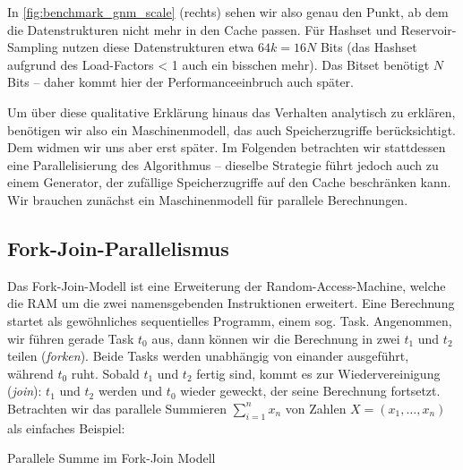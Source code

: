 In \cref{fig:benchmark_gnm_scale} (rechts) sehen wir also genau den Punkt, ab dem die Datenstrukturen nicht mehr in den Cache passen.
Für Hashset und Reservoir-Sampling nutzen diese Datenstrukturen etwa $64 k = 16 N$ Bits (das Hashset aufgrund des Load-Factors < 1 auch ein bisschen mehr).
Das Bitset benötigt $N$ Bits -- daher kommt hier der Performanceeinbruch auch später.

Um über diese qualitative Erklärung hinaus das Verhalten analytisch zu erklären, benötigen wir also ein Maschinenmodell, das auch Speicherzugriffe berücksichtigt.
Dem widmen wir uns aber erst später.
Im Folgenden betrachten wir stattdessen eine Parallelisierung des Algorithmus -- dieselbe Strategie führt jedoch auch zu einem Generator, der zufällige Speicherzugriffe auf den Cache beschränken kann.
Wir brauchen zunächst ein Maschinenmodell für parallele Berechnungen.

\subsection{Fork-Join-Parallelismus}
Das Fork-Join-Modell ist eine Erweiterung der Random-Access-Machine, welche die RAM um die zwei namensgebenden Instruktionen erweitert.
Eine Berechnung startet als gewöhnliches sequentielles Programm, einem sog. Task.
Angenommen, wir führen gerade Task $t_0$ aus, dann können wir die Berechnung in zwei  $t_1$ und $t_2$ tei\-len  (\emph{forken}).
Beide Tasks werden unabhängig von einander ausgeführt, während $t_0$ ruht.
Sobald $t_1$ und $t_2$ fertig sind, kommt es zur Wiedervereinigung  (\emph{join}):
$t_1$ und $t_2$ werden  und $t_0$ wieder geweckt, der seine Berechnung fortsetzt.
Betrachten wir das parallele Summieren $\sum_{i=1}^n x_n$ von Zahlen $X = (x_1, \ldots, x_n)$ als einfaches Beispiel:

\begin{algorithm}
    \caption{Parallele Summe im Fork-Join Modell}
    \label{algo:parallel_sum}
\end{algorithm}

